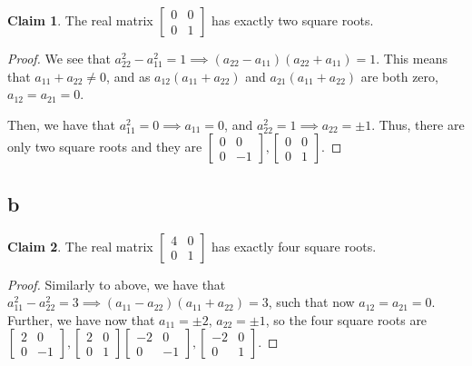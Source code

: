 \documentclass[12pt,letterpaper]{article}
\theoremstyle{definition}
\newtheorem*{claim}{Claim}
\begin{document}
\begin{claim}
  The real matrix $
  \begin{bmatrix}
    0 & 0 \\
    0 & 1
  \end{bmatrix}
  $ has exactly two square roots.
\end{claim}

\begin{proof}
 We see that $a_{22}^2 - a_{11}^2 = 1 \implies (a_{22} - a_{11})(a_{22} + a_{11})
 = 1$. This means that $a_{11} + a_{22} \neq 0$, and as $a_{12}(a_{11} +
 a_{22})$ and  $a_{21}(a_{11} + a_{22})$ are both zero, $a_{12} = a_{21} = 0$.

 Then, we have that $a_{11}^2 = 0 \implies a_{11} = 0$, and $a_{22}^2 = 1
 \implies a_{22} = \pm 1$. Thus, there are only two square roots and they are $
 \begin{bmatrix}
   0 & 0 \\
   0 & -1
 \end{bmatrix},
 \begin{bmatrix}
   0 & 0 \\
   0 & 1
 \end{bmatrix}
$.
\end{proof}

\subsection*{b}

\begin{claim}
  The real matrix $
  \begin{bmatrix}
    4 & 0 \\
    0 & 1
  \end{bmatrix}
  $ has exactly four square roots.
\end{claim}

\begin{proof}
  Similarly to above, we have that $a_{11}^2 - a_{22}^2 = 3 \implies (a_{11} - a_{22})(a_{11} + a_{22})
  = 3$, such that now $a_{12} = a_{21} = 0$. Further, we have now that $a_{11} =
  \pm 2$, $a_{22} = \pm1$, so the four square roots are$
  \begin{bmatrix}
    2 & 0 \\
    0 & -1
  \end{bmatrix},
  \begin{bmatrix}
    2 & 0 \\
    0 & 1
  \end{bmatrix}
  \begin{bmatrix}
    -2 & 0 \\
    0 & -1
  \end{bmatrix},
  \begin{bmatrix}
    -2 & 0 \\
    0 & 1
  \end{bmatrix}
  $.
\end{proof}
\end{document}
